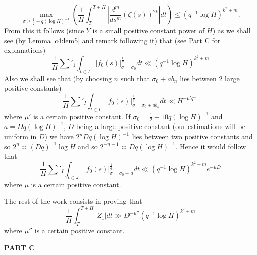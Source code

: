 \begin{equation*}
\max\limits_{\sigma \geq \frac{1}{2} + q (\log H)^{-1}} \left(\frac{1}{H} \int^{T+H}_T |\frac{d^m}{ds^m} (\zeta(s))^{2k}| dt\right) \leq (q^{-1} \log H)^{k^2 + m} . \tag{4.2.16}\label{c4:eq4.2.16}
\end{equation*}
From this it follows (since $Y$ is a small positive constant power of $H$) as we shall see (by Lemma \ref{c4:lem5} and remark following it) that (see Part C for explanations)
$$
\frac{1}{H} \sum'_1 \int_{t\in I} |f_0(s)|^{\frac{1}{q}}_{\sigma = \sigma_0} dt \ll (q^{-1} \log H)^{k^2 +m}
$$
Also we shall see that (by choosing $n$ such that $\sigma_0 + ab_n$ lies between 2 large positive constants)
$$
\frac{1}{H} \sum'_I \int_{t \in I} |f_0(s)|^{\frac{1}{q}}_{\sigma = \sigma_0 + ab_n} dt \ll H^{-\mu' q^{-1}}
$$
where $\mu'$ is a certain positive constant. If $\sigma_0 =\frac{1}{2} + 10 q(\log H)^{-1}$ and $a = Dq (\log H)^{-1}$, $D$ being a large positive constant (our estimations will be uniform in $D$) we have $2^n Dq (\log H)^{-1}$ lies between two positive constants and so $2^n \asymp (Dq)^{-1} \log H$ and so $2^{-n-1} \asymp Dq(\log H)^{-1}$. Hence it would follow that
$$
\frac{1}{H} \sum'_I \int_{t \in J} |f_0 (s)|^{\frac{1}{q}}_{\sigma = \sigma_0 + a}dt \ll (q^{-1} \log H)^{k^2 + m} e^{-\mu D}
$$ 
where $\mu$ is a certain positive constant.

The rest of the work consists in proving that
$$
\frac{1}{H} \int^{T+H}_T |Z_1| dt \gg D^{-\mu''} (q^{-1} \log H)^{k^2 + m}
$$
where $\mu''$ is a certain positive constant.

\begin{center}
\textbf{PART C}
\end{center}


